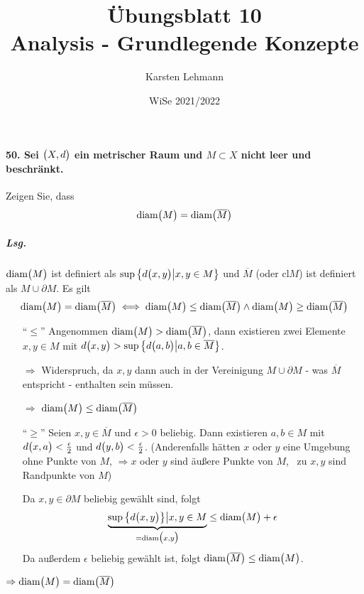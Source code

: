 \documentclass{scrreprt}
\author{Karsten Lehmann}
\date{WiSe 2021/2022}
\title{Übungsblatt 10\\Analysis - Grundlegende Konzepte}
\newcommand\diam{\text{diam}}
\begin{document}
\paragraph{50. Sei $\qty\big(X, d)$ ein metrischer Raum und $M \subset X$
  nicht leer und beschränkt.}
Zeigen Sie, dass
\[
  \diam\qty\big(M) = \diam\qty\big(\overline{M})
\]

\subparagraph{Lsg.} $\diam\qty\big(M)$ ist definiert als
$\sup \qty\big{d\qty\big(x, y) {\big |} x, y \in M}$ und
$\overline{M}$ (oder $\text{cl}M$) ist definiert als $M \cup \partial M$.
Es gilt
\[
  \diam\qty\big(M) = \diam\qty\big(\overline{M}) \iff
  \diam\qty\big(M) \leq \diam\qty\big(\overline{M}) \land
  \diam\qty\big(M) \geq \diam\qty\big(\overline{M})
\]
\begin{itemize}
\item[``$\leq$''] Angenommen $\diam\qty\big(M) > \diam\qty\big(\overline{M})$,
  dann existieren zwei Elemente $x, y \in M$ mit $d\qty\big(x, y) >
  \sup\qty\big{d\qty\big(a, b) {\big |} a, b \in \overline{M}}$.

  $\Rightarrow$ Widerspruch, da $x, y$ dann auch in der Vereinigung
  $M \cup \partial M$ - was $\overline{M}$ entspricht - enthalten sein
  müssen.

  $\Rightarrow$ \underline{$\diam\qty\big(M) \leq \diam\qty\big(\overline{M})$}

\item[``$\geq$''] Seien $x, y \in \overline{M}$ und $\epsilon > 0$ beliebig.
  Dann existieren $a, b \in M$ mit $d\qty\big(x, a) < \frac{\epsilon}{2}$
  und $d\qty\big(y, b) < \frac{\epsilon}{2}$.
  (Anderenfalls hätten $x$ oder $y$ eine Umgebung ohne Punkte von $M$,
  $\Rightarrow x$ oder $y$ sind äußere Punkte von $M$, \Lightning\,
  zu $x, y$ sind Randpunkte von $M$)

  Da $x, y \in \partial M$  beliebig gewählt sind, folgt
  \[
    \underset{= \diam\qty\big(x, y)}
    {\underbrace{\sup\qty\big{d\qty\big(x, y)} {\big |} x, y \in M}}
    \leq \diam\qty\big(M) + \epsilon
  \]
  Da außerdem $\epsilon$ beliebig gewählt ist, folgt
  \underline{$\diam\qty\big(\overline{M}) \leq \diam\qty\big(M)$}.
\end{itemize}

$\Rightarrow \diam\qty\big(M) = \diam\qty\big(\overline{M})$
\end{document}
